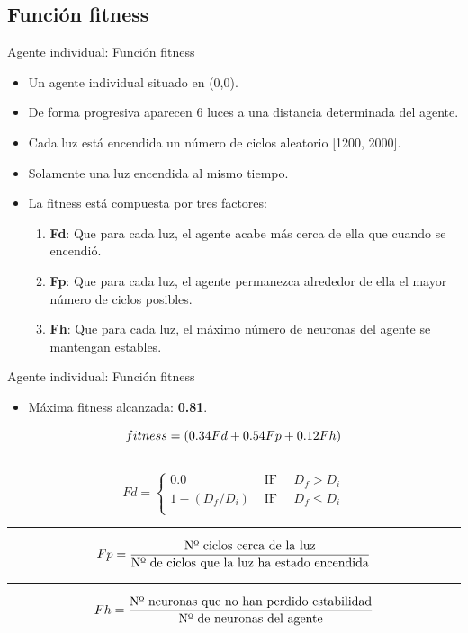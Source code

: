 \documentclass[aspectratio=169]{beamer}
\begin{document}
\subsection{Función fitness}
\begin{frame}{Agente individual: Función fitness}
  \begin{itemize}
    \item Un agente individual situado en (0,0).
    \item De forma progresiva aparecen 6 luces a una distancia determinada del agente.
    \item Cada luz está encendida un número de ciclos aleatorio [1200, 2000].
    \item Solamente una luz encendida al mismo tiempo.
    \item La fitness está compuesta por tres factores:
    \begin{enumerate}
      \item \textbf{Fd}: Que para cada luz, el agente acabe más cerca de ella que cuando se encendió.
      \item \textbf{Fp}: Que para cada luz, el agente permanezca alrededor de ella el mayor número de ciclos posibles.
      \item \textbf{Fh}: Que para cada luz, el máximo número de neuronas del agente se mantengan estables.
    \end{enumerate}
  \end{itemize}
\end{frame}

\begin{frame}{Agente individual: Función fitness}
\begin{itemize}

  \item Máxima fitness alcanzada: \textbf{0.81}.
\end{itemize}

\begin{equation*}
 \centering
  fitness = (0.34Fd + 0.54Fp + 0.12Fh)
\end{equation*}
\noindent\rule{14cm}{0.4pt}

\begin{equation*}
  Fd=\begin{cases}
0.0 & \text{ IF }\quad D_{f} > D_{i}  \\
1 - (D_{f} / D_{i}) & \text{ IF }\quad D_{f} \leq D_{i} \\
\end{cases}
\end{equation*}
\noindent\rule{14cm}{0.4pt}

\begin{equation*}
\centering
Fp = \frac{\text{Nº ciclos cerca de la luz}}{\text{Nº de ciclos que la luz ha estado encendida}}
\end{equation*}
\noindent\rule{14cm}{0.4pt}

\begin{equation*}
\centering
Fh = \frac{\text{Nº neuronas que no han perdido estabilidad}}{\text{Nº de neuronas del agente}}
\end{equation*}
\end{frame}
\end{document}
